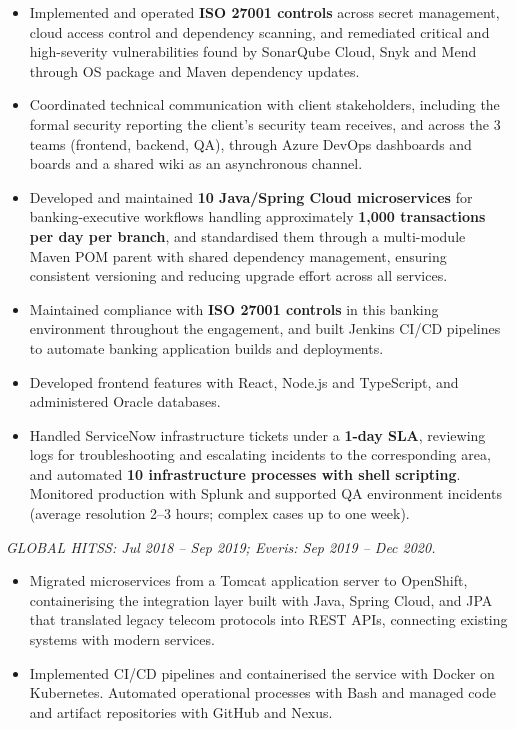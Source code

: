{\begin{itemize}
    \item Implemented and operated \textbf{ISO 27001 controls} across secret management, cloud access control and dependency scanning, and remediated critical and high-severity vulnerabilities found by SonarQube Cloud, Snyk and Mend through OS package and Maven dependency updates.
    \item Coordinated technical communication with client stakeholders, including the formal security reporting the client's security team receives, and across the 3 teams (frontend, backend, QA), through Azure DevOps dashboards and boards and a shared wiki as an asynchronous channel.
\end{itemize}

\begin{itemize}
    \item Developed and maintained \textbf{10 Java/Spring Cloud microservices} for banking-executive workflows handling approximately \textbf{1{,}000 transactions per day per branch}, and standardised them through a multi-module Maven POM parent with shared dependency management, ensuring consistent versioning and reducing upgrade effort across all services.
    \item Maintained compliance with \textbf{ISO 27001 controls} in this banking environment throughout the engagement, and built Jenkins CI/CD pipelines to automate banking application builds and deployments.
    \item Developed frontend features with React, Node.js and TypeScript, and administered Oracle databases.
    \item Handled ServiceNow infrastructure tickets under a \textbf{1-day SLA}, reviewing logs for troubleshooting and escalating incidents to the corresponding area, and automated \textbf{10 infrastructure processes with shell scripting}. Monitored production with Splunk and supported QA environment incidents (average resolution 2--3 hours; complex cases up to one week).
\end{itemize}

\textit{GLOBAL HITSS: Jul 2018 -- Sep 2019; Everis: Sep 2019 -- Dec 2020.}\par\vspace{3pt}
\begin{itemize}
    \item Migrated microservices from a Tomcat application server to OpenShift, containerising the integration layer built with Java, Spring Cloud, and JPA that translated legacy telecom protocols into REST APIs, connecting existing systems with modern services.
    \item Implemented CI/CD pipelines and containerised the service with Docker on Kubernetes. Automated operational processes with Bash and managed code and artifact repositories with GitHub and Nexus.
\end{itemize}

}

